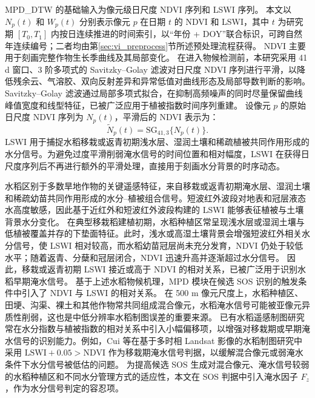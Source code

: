 MPD\_DTW 的基础输入为像元级日尺度 NDVI 序列和 LSWI 序列。
本文以 \(N_p(t)\) 和 \(W_p(t)\) 分别表示像元 \(p\) 在日期 \(t\) 的 NDVI 和 LSWI，其中 \(t\) 为研究期 \([T_0,T_1]\) 内按日连续推进的时间索引，以“年份 + DOY”联合标识，可跨自然年连续编号；二者均由第\ref{sec:vi_preprocess}节所述预处理流程获得。
NDVI 主要用于刻画完整作物生长季曲线及其局部变化。
在进入物候检测前，本研究采用 41 d 窗口、3 阶多项式的 Savitzky--Golay 滤波对日尺度 NDVI 序列进行平滑，以降低残余云、气溶胶、双向反射差异和异常低值对曲线形态及局部导数判断的影响。Savitzky--Golay 滤波通过局部多项式拟合，在抑制高频噪声的同时尽量保留曲线峰值宽度和线型特征，已被广泛应用于植被指数时间序列重建\cite{Chen2004RSE}。
设像元 \(p\) 的原始日尺度 NDVI 序列为 \(N_p(t)\)，平滑后的 NDVI 表示为：
\begin{equation}
    \widetilde{N}_p(t)=\mathrm{SG}_{41,3}\{N_p(t)\}.
    \label{eq:sg_ndvi}
\end{equation}
LSWI 用于捕捉水稻移栽或返青初期浅水层、湿润土壤和稀疏植被共同作用形成的水分信号。为避免过度平滑削弱淹水信号的时间位置和相对幅度，LSWI 在获得日尺度序列后不再进行额外的平滑处理，直接用于刻画水分背景的时序动态。

水稻区别于多数旱地作物的关键遥感特征，来自移栽或返青初期淹水层、湿润土壤和稀疏幼苗共同作用形成的水分--植被组合信号。短波红外波段对地表和冠层液态水高度敏感，因此基于近红外和短波红外波段构建的 LSWI 能够表征植被与土壤背景水分变化\cite{Gao1996}。
在典型移栽稻建植初期，水稻种植区常呈现浅水层或湿润土壤与低植被覆盖并存的下垫面特征。此时，浅水或高湿土壤背景会增强短波红外相关水分信号，使 LSWI 相对较高，而水稻幼苗冠层尚未充分发育，NDVI 仍处于较低水平；随着返青、分蘖和冠层闭合，NDVI 迅速升高并逐渐超过水分信号。
因此，移栽或返青初期 LSWI 接近或高于 NDVI 的相对关系，已被广泛用于识别水稻早期淹水信号\cite{Xiao2005,Xiao2006}。
基于上述水稻物候机理，MPD 模块在候选 SOS 识别的触发条件中引入了 NDVI 与 LSWI 的相对关系。
在 500 m 像元尺度上，水稻种植区、田埂、沟渠、裸土和其他作物常共同组成混合像元，水稻淹水信号可能被亚像元异质性削弱，这也是中低分辨率水稻制图误差的重要来源\cite{Teluguntla2015RS,Han2021}。
已有水稻遥感制图研究常在水分指数与植被指数的相对关系中引入小幅偏移项，以增强对移栽期或早期淹水信号的识别能力。例如，Cui 等在基于多时相 Landsat 影像的水稻制图研究中采用 \(\mathrm{LSWI}+0.05>\mathrm{NDVI}\) 作为移栽期淹水信号判据\cite{Cui2015}，以缓解混合像元或弱淹水条件下水分信号被低估的问题。
为提高候选 SOS 生成对混合像元、淹水信号较弱的水稻种植区和不同水分管理方式的适应性，本文在 SOS 判据中引入淹水因子 \(F_z\)，作为水分信号判定的容忍项。


